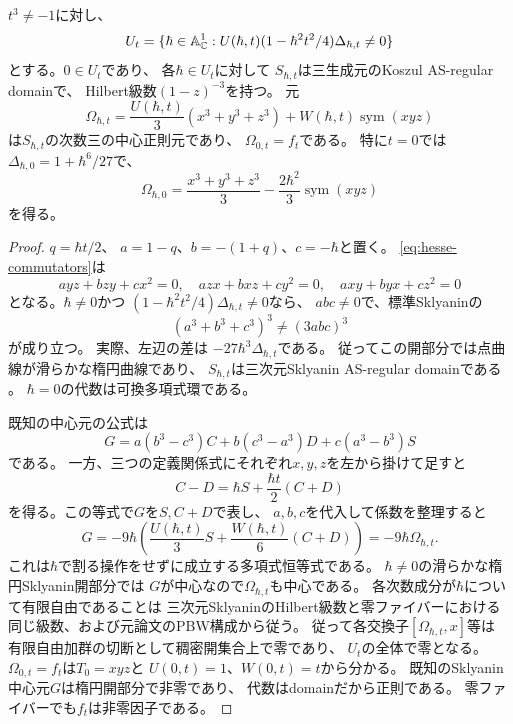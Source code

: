 \begin{theorem}[Hesse中心三次式の閉公式]
\label{thm:explicit-hesse-center}
$t^3\ne-1$に対し、
\[
 U_t=\{\hbar\in\mathbb A^1_{\mathbb C}:
   U(\hbar,t)(1-\hbar^2t^2/4)\Delta_{\hbar,t}\ne0\}
\]
とする。$0\in U_t$であり、
各$\hbar\in U_t$に対して
$S_{\hbar,t}$は三生成元のKoszul AS-regular domainで、
Hilbert級数$(1-z)^{-3}$を持つ。
元
\[
 \boxed{\quad
 \Omega_{\hbar,t}=
   \frac{U(\hbar,t)}3(x^3+y^3+z^3)
   +W(\hbar,t)\operatorname{sym}(xyz)
 \quad}
 \tag{HC}\label{eq:hesse-central-element}
\]
は$S_{\hbar,t}$の次数三の中心正則元であり、
$\Omega_{0,t}=f_t$である。
特に$t=0$では
$\Delta_{\hbar,0}=1+\hbar^6/27$で、
\[
 \Omega_{\hbar,0}
 =\frac{x^3+y^3+z^3}{3}
   -\frac{2\hbar^2}{3}\operatorname{sym}(xyz)
\]
を得る。
\end{theorem}
\begin{proof}
$q=\hbar t/2$、
$a=1-q$、$b=-(1+q)$、$c=-\hbar$と置く。
\eqref{eq:hesse-commutators}は
\[
 ayz+bzy+cx^2=0,\quad
 azx+bxz+cy^2=0,\quad
 axy+byx+cz^2=0
\]
となる。$\hbar\ne0$かつ
$(1-\hbar^2t^2/4)\Delta_{\hbar,t}\ne0$なら、
$abc\ne0$で、標準Sklyaninの
\[
 (a^3+b^3+c^3)^3\ne(3abc)^3
\]
が成り立つ。
実際、左辺の差は
$-27\hbar^3\Delta_{\hbar,t}$である。
従ってこの開部分では点曲線が滑らかな楕円曲線であり、
$S_{\hbar,t}$は三次元Sklyanin AS-regular domainである
\cite{SmithTate,DeLaetLeBruyn}。
$\hbar=0$の代数は可換多項式環である。

既知の中心元の公式は
\[
 G=a(b^3-c^3)C+
   b(c^3-a^3)D+
   c(a^3-b^3)S
 \tag{G}\label{eq:hesse-sklyanin-G}
\]
である\cite[Section 2]{DeLaetLeBruyn}。
一方、三つの定義関係式にそれぞれ$x,y,z$を左から掛けて足すと
\[
 C-D=\hbar S+\frac{\hbar t}{2}(C+D)
 \tag{R}\label{eq:hesse-CD}
\]
を得る。この等式で$G$を$S,C+D$で表し、
$a,b,c$を代入して係数を整理すると
\[
 G=-9\hbar\left(
       \frac{U(\hbar,t)}3S+
       \frac{W(\hbar,t)}6(C+D)\right)
   =-9\hbar\Omega_{\hbar,t}.
 \tag{I}\label{eq:hesse-G-identity}
\]
これは$\hbar$で割る操作をせずに成立する多項式恒等式である。
$\hbar\ne0$の滑らかな楕円Sklyanin開部分では
$G$が中心なので$\Omega_{\hbar,t}$も中心である。
各次数成分が$\hbar$について有限自由であることは
三次元SklyaninのHilbert級数と零ファイバーにおける
同じ級数、および元論文のPBW構成から従う。
従って各交換子$[\Omega_{\hbar,t},x]$等は
有限自由加群の切断として稠密開集合上で零であり、
$U_t$の全体で零となる。
$\Omega_{0,t}=f_t$は$T_0=xyz$と
$U(0,t)=1$、$W(0,t)=t$から分かる。
既知のSklyanin中心元$G$は楕円開部分で非零であり、
代数はdomainだから正則である。
零ファイバーでも$f_t$は非零因子である。
\end{proof}


